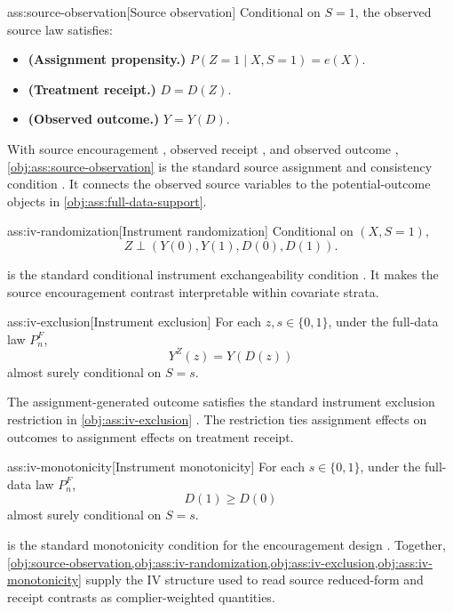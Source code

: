 \begin{assumptionv}{ass:source-observation}[Source observation]
Conditional on \(S=1\), the observed source law satisfies:
\begin{itemize}
\item \textbf{(Assignment propensity.)} \(P(Z=1\mid X,S=1)=e(X)\).
\item \textbf{(Treatment receipt.)} \(D=D(Z)\).
\item \textbf{(Observed outcome.)} \(Y=Y(D)\).
\end{itemize}
\end{assumptionv}

With source encouragement , observed receipt , and observed outcome , \cref{obj:ass:source-observation} is the standard source assignment and consistency condition \citep{ChenHuang2025}. It connects the observed source variables to the potential-outcome objects in \cref{obj:ass:full-data-support}.

\begin{assumptionv}{ass:iv-randomization}[Instrument randomization]
Conditional on \((X,S=1)\),
\[
Z\perp (Y(0),Y(1),D(0),D(1)).
\]
\end{assumptionv}

 is the standard conditional instrument exchangeability condition \citep{ChenHuang2025}. It makes the source encouragement contrast interpretable within covariate strata.

\begin{assumptionv}{ass:iv-exclusion}[Instrument exclusion]
For each \(z,s\in\{0,1\}\), under the full-data law \(P_n^F\),
\[
Y^Z(z)=Y(D(z))
\]
almost surely conditional on \(S=s\).
\end{assumptionv}

The assignment-generated outcome  satisfies the standard instrument exclusion restriction in \cref{obj:ass:iv-exclusion} \citep{ChenHuang2025}. The restriction ties assignment effects on outcomes to assignment effects on treatment receipt.

\begin{assumptionv}{ass:iv-monotonicity}[Instrument monotonicity]
For each \(s\in\{0,1\}\), under the full-data law \(P_n^F\),
\[
D(1)\ge D(0)
\]
almost surely conditional on \(S=s\).
\end{assumptionv}

 is the standard monotonicity condition for the encouragement design \citep{ChenHuang2025}. Together, \cref{obj:source-observation,obj:ass:iv-randomization,obj:ass:iv-exclusion,obj:ass:iv-monotonicity} supply the IV structure used to read source reduced-form and receipt contrasts as complier-weighted quantities.

